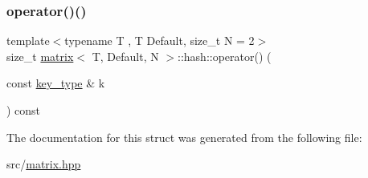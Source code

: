 \mbox{\label{structmatrix_1_1hash_a39d8ff8cf4dcd1ae2cda997d93ebe6ec}} 
\subsubsection{\texorpdfstring{operator()()}{operator()()}}
{\footnotesize\ttfamily template$<$typename T , T Default, size\+\_\+t N = 2$>$ \\
size\+\_\+t \hyperlink{structmatrix}{matrix}$<$ T, Default, N $>$\+::hash\+::operator() (\begin{DoxyParamCaption}\item[{const \hyperlink{structmatrix_ae7906bda02f5d7f6744d9545c9465e13}{key\+\_\+type} \&}]{k }\end{DoxyParamCaption}) const\hspace{0.3cm}{\ttfamily [inline]}}



The documentation for this struct was generated from the following file\+:\begin{DoxyCompactItemize}
\item 
src/\hyperlink{matrix_8hpp}{matrix.\+hpp}\end{DoxyCompactItemize}
